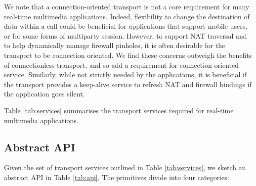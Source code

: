 \documentclass{sig-alternate-05-2015}
\begin{document}
We note that a connection-oriented transport is not a core requirement for
many real-time multimedia applications.  Indeed, flexibility to change the
destination of data within a call could be beneficial for applications that
support mobile users, or for some forms of multiparty session. However, to
support NAT traversal and to help dynamically manage firewall pinholes, it
is often desirable for the transport to be connection oriented. We find
these concerns outweigh the benefits of connectionless transport, and so
add a requirement for connection oriented service. 
Similarly, while not strictly needed by the applications, it is beneficial
if the transport provides a keep-alive service to refresh NAT and firewall
bindings if the application goes silent. 

Table \ref{tab:services} summarises the transport services required for
real-time multimedia applications. 

\subsection{Abstract API}

Given the set of transport services outlined in Table \ref{tab:services}, 
we sketch an abstract API in  Table \ref{tab:api}. The primitives divide
into four categories:
\end{document}
